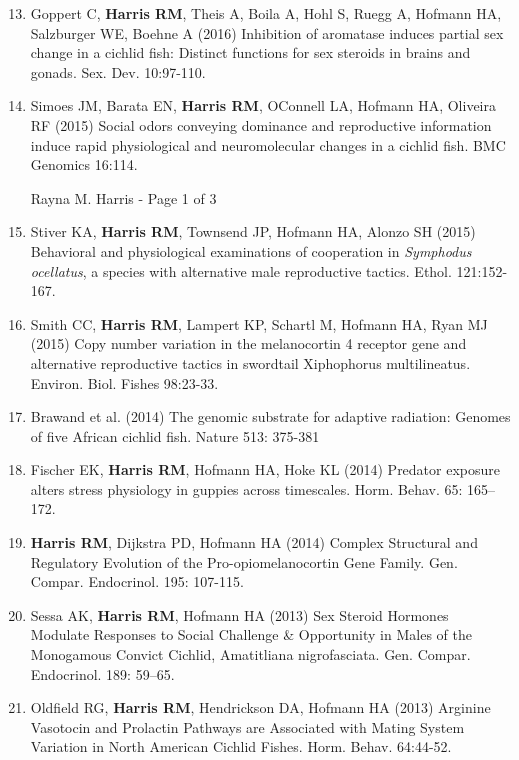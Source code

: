 \documentclass[margin,line]{CV}
\newenvironment{benumerate}[1]{
    \let\oldItem\item
    \def\item{\addtocounter{enumi}{-2}\oldItem}
    \begin{enumerate}
    \setcounter{enumi}{#1}
    \addtocounter{enumi}{1}
}{
    \end{enumerate}
}
\begin{document}
\begin{resume}
\begin{benumerate}{12}
\item Goppert C, {\bf Harris RM}, Theis A, Boila A, Hohl S, Ruegg A, Hofmann HA, Salzburger WE, Boehne A (2016) Inhibition of aromatase induces partial sex change in a cichlid fish: Distinct functions for sex steroids in brains and gonads. Sex. Dev. 10:97-110.

\item Simoes JM, Barata EN, {\bf Harris RM}, O\textsc{}Connell LA, Hofmann HA, Oliveira RF (2015) Social odors conveying dominance and reproductive information induce rapid physiological and neuromolecular changes in a cichlid fish. BMC Genomics 16:114. 

\vspace{0.4 cm}
{\centerline {Rayna M. Harris - Page 1 of 3}}
\newpage

\item Stiver KA, {\bf Harris RM}, Townsend JP, Hofmann HA, Alonzo SH (2015) Behavioral and physiological examinations of cooperation in {\it Symphodus ocellatus}, a species with alternative male reproductive tactics. Ethol. 121:152-167.

\item Smith CC, {\bf Harris RM}, Lampert KP, Schartl M, Hofmann HA, Ryan MJ (2015) Copy number variation in the melanocortin 4 receptor gene and alternative reproductive tactics in swordtail Xiphophorus multilineatus. Environ. Biol. Fishes 98:23-33.

\item Brawand et al. (2014) The genomic substrate for adaptive radiation: Genomes of five African cichlid fish. Nature 513: 375-381

\item Fischer EK, {\bf Harris RM}, Hofmann HA, Hoke KL (2014) Predator exposure alters stress physiology in guppies across timescales. Horm. Behav. 65: 165–172. 


\item {\bf Harris RM}, Dijkstra PD, Hofmann HA (2014) Complex Structural and Regulatory Evolution of the Pro-opiomelanocortin Gene Family. Gen. Compar. Endocrinol. 195: 107-115. 

\item Sessa AK, {\bf Harris RM}, Hofmann HA (2013) Sex Steroid Hormones Modulate Responses to Social Challenge \& Opportunity in Males of the Monogamous Convict Cichlid, Amatitliana nigrofasciata. Gen. Compar. Endocrinol. 189: 59–65. 

\item Oldfield RG, {\bf Harris RM}, Hendrickson DA, Hofmann HA (2013) Arginine Vasotocin and Prolactin Pathways are Associated with Mating System Variation in North American Cichlid Fishes. Horm. Behav. 64:44-52. 
\end{benumerate}






\end{resume}
\end{document}
